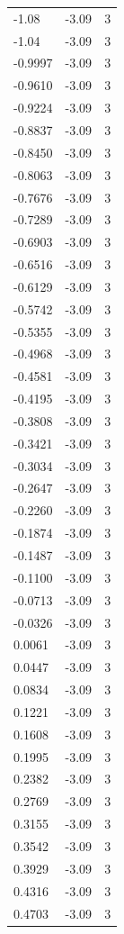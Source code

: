 \begin{longtable}{lrr}
  -1.08 & -3.09 & 3 \\
  -1.04 & -3.09 & 3 \\
  -0.9997 & -3.09 & 3 \\
  -0.9610 & -3.09 & 3 \\
  -0.9224 & -3.09 & 3 \\
  -0.8837 & -3.09 & 3 \\
  -0.8450 & -3.09 & 3 \\
  -0.8063 & -3.09 & 3 \\
  -0.7676 & -3.09 & 3 \\
  -0.7289 & -3.09 & 3 \\
  -0.6903 & -3.09 & 3 \\
  -0.6516 & -3.09 & 3 \\
  -0.6129 & -3.09 & 3 \\
  -0.5742 & -3.09 & 3 \\
  -0.5355 & -3.09 & 3 \\
  -0.4968 & -3.09 & 3 \\
  -0.4581 & -3.09 & 3 \\
  -0.4195 & -3.09 & 3 \\
  -0.3808 & -3.09 & 3 \\
  -0.3421 & -3.09 & 3 \\
  -0.3034 & -3.09 & 3 \\
  -0.2647 & -3.09 & 3 \\
  -0.2260 & -3.09 & 3 \\
  -0.1874 & -3.09 & 3 \\
  -0.1487 & -3.09 & 3 \\
  -0.1100 & -3.09 & 3 \\
  -0.0713 & -3.09 & 3 \\
  -0.0326 & -3.09 & 3 \\
  0.0061 & -3.09 & 3 \\
  0.0447 & -3.09 & 3 \\
  0.0834 & -3.09 & 3 \\
  0.1221 & -3.09 & 3 \\
  0.1608 & -3.09 & 3 \\
  0.1995 & -3.09 & 3 \\
  0.2382 & -3.09 & 3 \\
  0.2769 & -3.09 & 3 \\
  0.3155 & -3.09 & 3 \\
  0.3542 & -3.09 & 3 \\
  0.3929 & -3.09 & 3 \\
  0.4316 & -3.09 & 3 \\
  0.4703 & -3.09 & 3 \\

\end{longtable}
